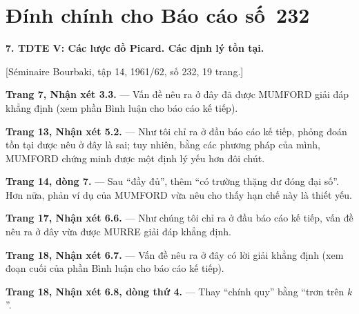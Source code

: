 \clearpage
\chapter*{Đính chính cho Báo cáo số~232}

\noindent\textbf{7. TDTE V: Các lược đồ Picard. Các định lý tồn tại.}

\begin{center}
[Séminaire Bourbaki, tập 14, 1961/62, số 232, 19 trang.]
\end{center}

\noindent\textbf{Trang 7, Nhận xét 3.3.} --- Vấn đề nêu ra ở đây đã được
MUMFORD giải đáp khẳng định (xem phần Bình luận cho báo cáo kế tiếp).

\noindent\textbf{Trang 13, Nhận xét 5.2.} --- Như tôi chỉ ra ở đầu báo cáo kế
tiếp, phỏng đoán tồn tại được nêu ở đây là sai; tuy nhiên, bằng các phương pháp
của mình, MUMFORD chứng minh được một định lý yếu hơn đôi chút.

\noindent\textbf{Trang 14, dòng 7.} --- Sau ``đầy đủ'', thêm ``có trường thặng
dư đóng đại số''. Hơn nữa, phản ví dụ của MUMFORD vừa nêu cho thấy hạn chế này
là thiết yếu.

\noindent\textbf{Trang 17, Nhận xét 6.6.} --- Như chúng tôi chỉ ra ở đầu báo
cáo kế tiếp, vấn đề nêu ra ở đây vừa được MURRE giải đáp khẳng định.

\noindent\textbf{Trang 18, Nhận xét 6.7.} --- Vấn đề nêu ra ở đây có lời giải
khẳng định (xem đoạn cuối của phần Bình luận cho báo cáo kế tiếp).

\noindent\textbf{Trang 18, Nhận xét 6.8, dòng thứ 4.} --- Thay ``chính quy''
bằng ``trơn trên $k$''.

\par
